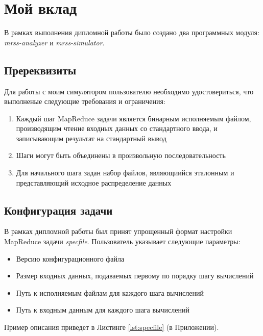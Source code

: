 \documentclass[../diploma.tex]{subfile}
\begin{document}
    \section{Мой вклад}\label{sec:results}

    В рамках выполнения дипломной работы было создано два программных модуля:
    \textit{mrss-analyzer} и \textit{mrss-simulator}.


    \subsection{Пререквизиты}

    Для работы с моим симулятором пользователю необходимо удостовериться, что
    выполненые следующие требования и ограничения:

    \begin{enumerate}
        \item Каждый шаг MapReduce задачи является бинарным исполняемым файлом,
              производящим чтение входных данных со стандартного ввода, и
              записывающим результат на стандартный вывод
        \item Шаги могут быть объединены в произвольную последовательность
        \item Для начального шага задан набор файлов, являющиийся эталонным и
              представляющий исходное распределение данных
    \end{enumerate}

    \subsection{Конфигурация задачи}

    В рамках дипломной работы был принят упрощенный формат настройки MapReduce
    задачи \textit{specfile}. Пользователь указывает следующие параметры:
    
    \begin{itemize}
        \item Версию конфигурационного файла
        \item Размер входных данных, подаваемых первому по порядку шагу вычислений
        \item Путь к исполняемым файлам для каждого шага вычислений
        \item Путь к входным данным для каждого шага вычислений
    \end{itemize}

    Пример описания приведет в Листинге \ref{lst:specfile} (в Приложении). 
    
\end{document}
